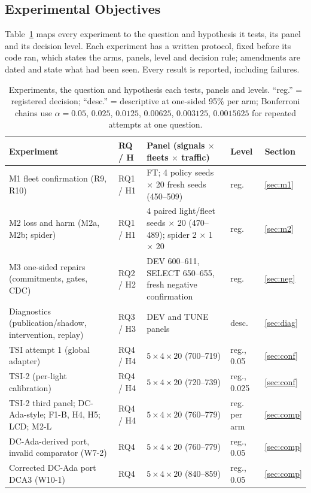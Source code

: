 \subsection{Experimental Objectives}
Table~\ref{tab:expmap} maps every experiment to the question and hypothesis it tests, its panel and its decision level. Each experiment has
a written protocol, fixed before its code ran, which states the arms, panels, level and decision rule; amendments are dated and state what
had been seen. Every result is reported, including failures.
\begin{table}[t]\centering\footnotesize
\caption{Experiments, the question and hypothesis each tests, panels and levels. ``reg.'' = registered decision; ``desc.'' = descriptive
at one-sided 95\% per arm; Bonferroni chains use $\alpha=0.05$, $0.025$, $0.0125$, $0.00625$, $0.003125$, $0.0015625$ for repeated attempts at one question.}\label{tab:expmap}
\begin{tabular}{@{}p{5.3cm}p{1.5cm}p{6.0cm}p{2.5cm}l@{}}\toprule
Experiment & RQ / H & Panel (signals $\times$ fleets $\times$ traffic) & Level & Section\\\midrule
M1 fleet confirmation (R9, R10) & RQ1 / H1 & FT; 4 policy seeds $\times$ 20 fresh seeds (450--509) & reg. & \ref{sec:m1}\\
M2 loss and harm (M2a, M2b; spider) & RQ1 / H1 & 4 paired light/fleet seeds $\times$ 20 (470--489); spider 2 $\times$ 1 $\times$ 20 & reg. & \ref{sec:m2}\\
M3 one-sided repairs (commitments, gates, CDC) & RQ2 / H2 & DEV 600--611, SELECT 650--655, fresh negative confirmation & reg. & \ref{sec:neg}\\
Diagnostics (publication/shadow, intervention, replay) & RQ3 / H3 & DEV and TUNE panels & desc. & \ref{sec:diag}\\
TSI attempt 1 (global adapter) & RQ4 / H4 & $5\times4\times20$ (700--719) & reg., 0.05 & \ref{sec:conf}\\
TSI-2 (per-light calibration) & RQ4 / H4 & $5\times4\times20$ (720--739) & reg., 0.025 & \ref{sec:conf}\\
TSI-2 third panel; DC-Ada-style; F1-B, H4, H5; LCD; M2-L & RQ4 / H4 & $5\times4\times20$ (760--779) & reg. per arm & \ref{sec:comp}\\
DC-Ada-derived port, invalid comparator (W7-2) & RQ4 & $5\times4\times20$ (760--779) & reg., 0.05 & \ref{sec:comp}\\
Corrected DC-Ada port DCA3 (W10-1) & RQ4 & $5\times4\times20$ (840--859) & reg., 0.05 & \ref{sec:comp}\\

\end{tabular}
\end{table}

